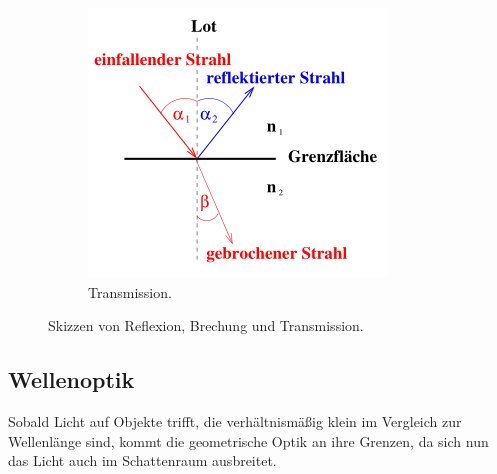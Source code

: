 \begin{figure}
\begin{subfigure}{0.3\textwidth}
        \centering
        \includegraphics{Bilder/Transmission.png}
        \caption{Transmission.}
        \label{fig:Transmission}
    \end{subfigure}
    \caption{Skizzen von Reflexion, Brechung und Transmission.}
    \label{fig:skizzen}
\end{figure}

\subsection{Wellenoptik}
\label{sec:Wellenoptik}
Sobald Licht auf Objekte trifft, die verhältnismäßig klein im Vergleich zur Wellenlänge sind, kommt die geometrische Optik an ihre
Grenzen, da sich nun das Licht auch im Schattenraum ausbreitet.